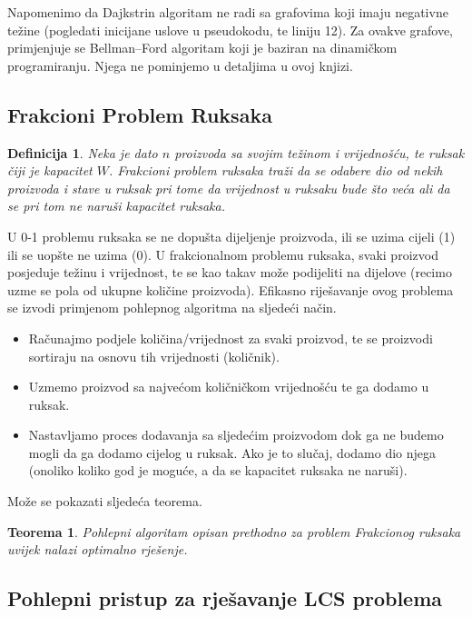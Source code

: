 \documentclass[a4paper, utf8, 11pt, colorlinks]{book}
\newtheorem{definition}{Definicija}
\newtheorem{thm}{Teorema}
\begin{document}
Napomenimo da Dajkstrin algoritam ne radi sa grafovima koji imaju negativne težine (pogledati inicijane uslove u  pseudokodu, te liniju 12).  Za ovakve grafove,  primjenjuje se Bellman–Ford algoritam koji je baziran na dinamičkom programiranju. Njega ne pominjemo u detaljima u ovoj knjizi.  %

\subsection{Frakcioni Problem Ruksaka}

\begin{definition}
  Neka je dato $n$ proizvoda sa svojim  težinom i vrijednošću, 
  te ruksak čiji je kapacitet $W$. Frakcioni problem ruksaka traži da se   odabere dio od nekih proizvoda i stave u ruksak pri tome da vrijednost u ruksaku bude što veća ali da se pri tom ne naruši kapacitet ruksaka.
\end{definition}
U 0-1 problemu ruksaka se ne dopušta dijeljenje proizvoda, ili se uzima cijeli (1) ili se uopšte ne uzima (0). U frakcionalnom problemu ruksaka, svaki proizvod posjeduje težinu i vrijednost, te se kao takav može podijeliti na dijelove (recimo uzme se pola od ukupne količine proizvoda). Efikasno riješavanje ovog problema se izvodi primjenom pohlepnog algoritma na sljedeći način. 
\begin{itemize}
	\item Računajmo podjele količina/vrijednost za svaki proizvod, te se proizvodi  sortiraju na osnovu tih vrijednosti (količnik).   \item Uzmemo proizvod sa najvećom količničkom vrijednošću te ga dodamo u ruksak. 
	\item Nastavljamo proces dodavanja sa sljedećim proizvodom dok ga ne budemo mogli da ga  dodamo cijelog u ruksak.    Ako je to slučaj, dodamo dio njega (onoliko koliko god je moguće, a da se kapacitet ruksaka ne naruši). 
\end{itemize}
Može se pokazati sljedeća teorema. 

\begin{thm}
      Pohlepni algoritam opisan prethodno za problem Frakcionog ruksaka uvijek nalazi optimalno rješenje.
\end{thm}
\subsection{Pohlepni pristup za rješavanje LCS problema}
\end{document}
